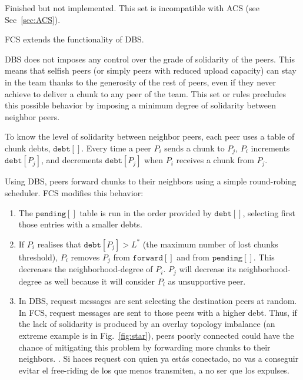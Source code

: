 
\label{sec:FCS}


\begin{notex}
  Finished but not implemented. This set is incompatible with ACS (see Sec~\ref{sec:ACS}).
\end{notex}

FCS extends the functionality of DBS.

DBS does not imposes any control over the grade of solidarity of the
peers. This means that selfish peers (or simply peers with reduced
upload capacity) can stay in the team thanks to the generosity of the
rest of peers, even if they never achieve to deliver a chunk to any
peer of the team. This set or rules precludes this possible behavior
by imposing a minimum degree of solidarity between neighbor peers.

To know the level of solidarity between neighbor peers, each peer uses
a table of chunk debts, $\mathtt{debt}[]$. Every time a peer $P_i$
sends a chunk to $P_j$, $P_i$ increments $\mathtt{debt}[P_j]$, and
decrements $\mathtt{debt}[P_j]$ when $P_i$ receives a chunk from
$P_j$. 

Using DBS, peers forward chunks to their neighbors using a simple
round-robing scheduler. FCS modifies this behavior:
\begin{enumerate}
\item The $\mathtt{pending}[]$ table is run in the order provided by
  $\mathtt{debt}[]$, selecting first those entries with a smaller
  debts.
\item If $P_i$ realises that $\mathtt{debt}[P_j]>L^*$ (the maximum
  number of lost chunks threshold), $P_i$ removes $P_j$ from
  $\mathtt{forward}[]$ and from $\mathtt{pending}[]$. This decreases
  the \gls{neighborhood-degree} of $P_i$. $P_j$ will decrease its
  \gls{neighborhood-degree} as well because it will consider $P_i$ as
  unsupportive peer.
\item In DBS, request messages are sent selecting the destination
  peers at random. In FCS, request messages are sent to those peers
  with a higher debt. Thus, if the lack of solidarity is produced by
  an overlay topology imbalance (an extreme example is in
  Fig.~\ref{fig:star}), peers poorly connected could have the chance
  of mitigating this problem by forwarding more chunks to their
  neighbors. . {\color{red} Si haces
    request con quien ya estás conectado, no vas a conseguir evitar el
    free-riding de los que menos transmiten, a no ser que los expulses}.
\end{enumerate}

